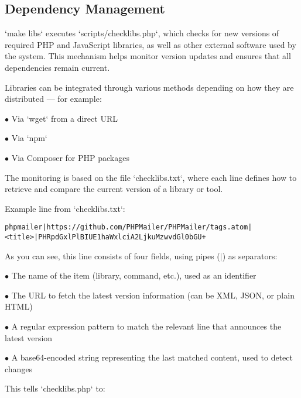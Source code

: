 \documentclass[a4paper]{article}
\begin{document}
\hypertarget{toc46}{}
\subsection{Dependency Management}

`make libs` executes `scripts/checklibs.php`, which checks for new versions of required PHP and JavaScript libraries, as well as other external software used by the system. This mechanism helps monitor version updates and ensures that all dependencies remain current.

Libraries can be integrated through various methods depending on how they are distributed — for example:

\begin{compactitem}
\item[\color{myblue}$\bullet$] Via `wget` from a direct URL
\item[\color{myblue}$\bullet$] Via `npm`
\item[\color{myblue}$\bullet$] Via Composer for PHP packages
\end{compactitem}

The monitoring is based on the file `checklibs.txt`, where each line defines how to retrieve and compare the current version of a library or tool.

Example line from `checklibs.txt`:

\begin{lstlisting}
phpmailer|https://github.com/PHPMailer/PHPMailer/tags.atom|<title>|PHRpdGxlPlBIUE1haWxlciA2LjkuMzwvdGl0bGU+
\end{lstlisting}

As you can see, this line consists of four fields, using pipes ($|$) as separators:

\begin{compactitem}
\item[\color{myblue}$\bullet$] The name of the item (library, command, etc.), used as an identifier
\item[\color{myblue}$\bullet$] The URL to fetch the latest version information (can be XML, JSON, or plain HTML)
\item[\color{myblue}$\bullet$] A regular expression pattern to match the relevant line that announces the latest version
\item[\color{myblue}$\bullet$] A base64-encoded string representing the last matched content, used to detect changes
\end{compactitem}

This tells `checklibs.php` to:
\end{document}
